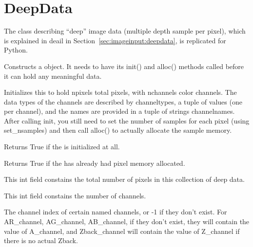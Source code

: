 \section{DeepData}
\label{sec:pythondeepdata}

The \DeepData class describing ``deep'' image data (multiple depth
sample per pixel), which is explained in deail in
Section~\ref{sec:imageinput:deepdata}, is replicated for Python.

Constructs a \DeepData object. It needs to have its {\cf init()} and
{\cf alloc()} methods called before it can hold any meaningful data.
\apiend

Initializes this \DeepData to hold {\cf npixels} total pixels, with
{\cf nchannels} color channels. The data types of the channels are
described by {\cf channeltypes}, a tuple of \TypeDesc values (one per
channel), and the names are provided in a tuple of {\cf string}s
{\cf channelnames}. After calling {\cf init}, you still need to set the number of
samples for each pixel (using {\cf set_nsamples}) and then call {\cf alloc()}
to actually allocate the sample memory.
\apiend

Returns {\cf True} if the \DeepData is initialized at all.
\apiend

Returns {\cf True} if the \DeepData has already had pixel memory allocated.
\apiend

This {\cf int} field constains the total number of pixels in this
collection of deep data.
\apiend

This {\cf int} field constains the number of channels.
\apiend

\NEW %
The channel index of certain named channels, or -1 if they don't exist. For
{\cf AR_channel}, {\cf AG_channel}, {\cf AB_channel}, if they don't exist,
they will contain the value of {\cf A_channel}, and {\cf Zback_channel} will
contain the value of {\cf Z_channel} if there is no actual {\cf Zback}.
\apiend

